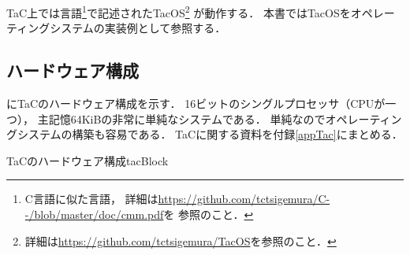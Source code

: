 TaC上では{\cmm}言語\footnote{
C言語に似た言語，
詳細は\url{https://github.com/tctsigemura/C--/blob/master/doc/cmm.pdf}を
参照のこと．}で記述されたTacOS\footnote{
詳細は\url{https://github.com/tctsigemura/TacOS}を参照のこと．} が動作する．
本書ではTacOSをオペレーティングシステムの実装例として参照する．

\subsection{ハードウェア構成}
にTaCのハードウェア構成を示す．
16ビットのシングルプロセッサ（CPUが一つ），
主記憶64KiBの非常に単純なシステムである．
単純なのでオペレーティングシステムの構築も容易である．
TaCに関する資料を付録\ref{appTac}にまとめる．

{TaCのハードウェア構成}{tacBlock}

